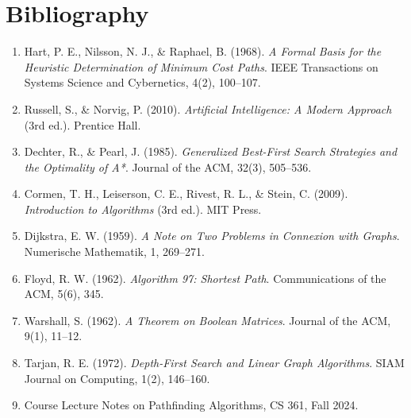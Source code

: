 \documentclass[12pt]{article}
\begin{document}
\section{Bibliography}
\begin{enumerate}
    \item Hart, P. E., Nilsson, N. J., \& Raphael, B. (1968). \textit{A Formal Basis for the Heuristic Determination of Minimum Cost Paths}. IEEE Transactions on Systems Science and Cybernetics, 4(2), 100–107.
    \item Russell, S., \& Norvig, P. (2010). \textit{Artificial Intelligence: A Modern Approach} (3rd ed.). Prentice Hall.
    \item Dechter, R., \& Pearl, J. (1985). \textit{Generalized Best-First Search Strategies and the Optimality of A*}. Journal of the ACM, 32(3), 505–536.
    \item Cormen, T. H., Leiserson, C. E., Rivest, R. L., \& Stein, C. (2009). \textit{Introduction to Algorithms} (3rd ed.). MIT Press.
    \item Dijkstra, E. W. (1959). \textit{A Note on Two Problems in Connexion with Graphs}. Numerische Mathematik, 1, 269–271.
    \item Floyd, R. W. (1962). \textit{Algorithm 97: Shortest Path}. Communications of the ACM, 5(6), 345.
    \item Warshall, S. (1962). \textit{A Theorem on Boolean Matrices}. Journal of the ACM, 9(1), 11–12.
    \item Tarjan, R. E. (1972). \textit{Depth-First Search and Linear Graph Algorithms}. SIAM Journal on Computing, 1(2), 146–160.
    \item Course Lecture Notes on Pathfinding Algorithms, CS 361, Fall 2024.
\end{enumerate}
\end{document}
